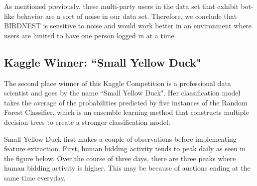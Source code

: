 \documentclass{article} %
\begin{document}

As mentioned previously, these multi-party users in the data set that exhibit bot-like behavior are a sort of noise in our data set. Therefore, we conclude that BIRDNEST is sensitive to noise and would work better in an environment where users are limited to have one person logged in at a time.

\subsection{Kaggle Winner: ``Small Yellow Duck"}

The second place winner of this Kaggle Competition is a professional data scientist and goes by the name ``Small Yellow Duck".
Her classification model takes the average of the probabilities predicted by five instances of the Random Forest Classifier, which is an ensemble learning method that constructs multiple decision trees to create a stronger classification model.

Small Yellow Duck first makes a couple of observations before implementing feature extraction.
First, human bidding activity tends to peak daily as seen in the figure below.
Over the course of three days, there are three peaks where human bidding activity is higher.
This may be because of auctions ending at the same time everyday.

\clearpage

\begin{figure}[h]
\centering
{}
\end{figure}
\end{document}
